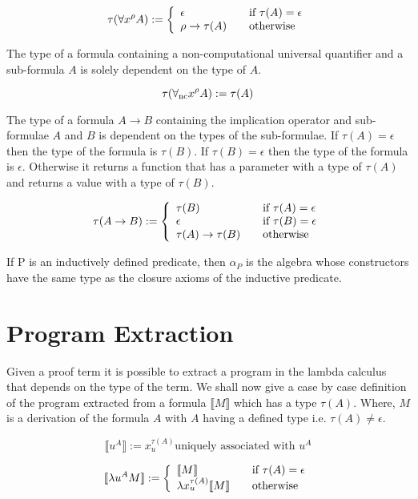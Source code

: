 \[
\tau(\forall x^{\rho} A) := \left\{ 
\begin{array}{l l}
  \epsilon & \quad \text{if $\tau(A) = \epsilon$}\\
 \rho \to \tau (A) & \quad \text{otherwise}\\
\end{array} \right.
\]


The type of a formula containing a non-computational universal quantifier and a sub-formula $A$
is solely dependent on the type of $A$.

\[
\tau(\forall_{\mathrm{nc}} x^{\rho} A) := \tau(A)
\]



The type of a formula $A \to B$ containing the implication operator and
sub-formulae $A$ and $B$ is dependent on the types of the sub-formulae.
If $\tau (A) = \epsilon$ then the type of the formula is $ \tau (B)$. If $\tau
(B) = \epsilon$ then the type of the formula is $\epsilon$. Otherwise it
returns a function that has a parameter with a type of $\tau (A)$ and returns a value with
a type of $\tau (B)$.

\[
\tau(A \to B) := \left\{ 
\begin{array}{l l}
  \tau (B) & \quad \text{if $\tau (A) = \epsilon$}\\
  \epsilon & \quad \text{if $\tau (B) = \epsilon$}\\
  \tau (A) \to \tau (B) & \quad \text{otherwise}\\
\end{array} \right.
\]

If P  is an inductively defined predicate, then $\alpha_P$ is the algebra whose constructors have the same type as the closure axioms of the inductive predicate.

\section{Program Extraction}
Given a proof term it is possible to extract a program in the lambda calculus  that depends on the type of the term. We shall now give a case by case definition of the program extracted from a formula $\llbracket M \rrbracket$ which has a type $\tau (A)$. Where, $M$ is a derivation of the formula $A$ with $A$ having a defined type i.e. $ \tau (A) \neq \epsilon $.

\[ \llbracket u^A \rrbracket := x^{\tau (A)}_{u} \text{uniquely associated with $u^A$}
\]

\[
\llbracket \lambda u^A M \rrbracket := \left\{ 
\begin{array}{l l}
\llbracket M \rrbracket  & \quad \text{if $\tau (A) = \epsilon$} \\ 
\lambda x^{\tau (A)}_{u} \llbracket M \rrbracket & \quad \text{otherwise} \\

\end{array} \right.
 \]

